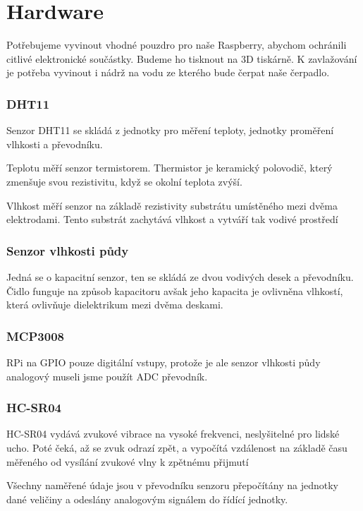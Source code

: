 \documentclass[11pt,a4paper]{article}
\begin{document}
\section*{Hardware}

Potřebujeme vyvinout vhodné pouzdro pro naše Raspberry, abychom ochránili citlivé elektronické součástky. Budeme ho tisknout na 3D tiskárně. K zavlažování je potřeba vyvinout i nádrž na vodu ze kterého bude čerpat naše čerpadlo.

\subsubsection*{DHT11}

Senzor DHT11 se skládá z jednotky pro měření teploty, jednotky proměření vlhkosti a převodníku.

Teplotu měří senzor termistorem. Thermistor je keramický polovodič, který zmenšuje svou rezistivitu, když se okolní teplota zvýší.

Vlhkost měří senzor na základě rezistivity substrátu umístěného mezi dvěma elektrodami. Tento substrát zachytává vlhkost a vytváří tak vodivé prostředí

\subsubsection*{Senzor vlhkosti půdy}

Jedná se o kapacitní senzor, ten se skládá ze dvou vodivých desek a převodníku. Čidlo funguje na způsob kapacitoru avšak jeho kapacita je ovlivněna vlhkostí, která ovlivňuje dielektrikum mezi dvěma deskami.

\subsubsection*{MCP3008}

RPi na GPIO pouze digitální vstupy, protože je ale senzor vlhkosti půdy analogový museli jsme použít ADC převodník.

\subsubsection*{HC-SR04}

HC-SR04 vydává zvukové vibrace na vysoké frekvenci, neslyšitelné pro lidské ucho. Poté čeká, až se zvuk odrazí zpět, a vypočítá vzdálenost na základě času měřeného od vysílání zvukové vlny k zpětnému přijmutí

Všechny naměřené údaje jsou v převodníku senzoru přepočítány na jednotky dané veličiny a odeslány analogovým signálem do řídící jednotky.
\end{document}
